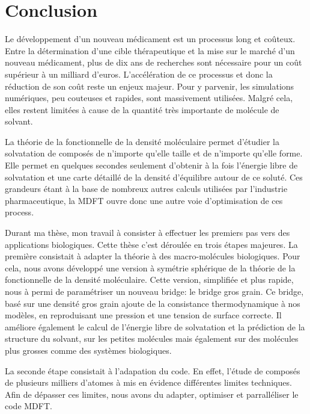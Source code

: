 \chapter{Conclusion}
\label{chap:conclusion}
Le développement d'un nouveau médicament est un processus long et co\^uteux. Entre la détermination d'une cible thérapeutique et la mise sur le marché d'un nouveau médicament, plus de dix ans de recherches sont nécessaire pour un coût supérieur à un milliard d'euros.
L'accélération de ce processus et donc la réduction de son coût reste un enjeux majeur. Pour y parvenir, les simulations numériques, peu couteuses et rapides, sont massivement utilisées. Malgré cela, elles restent limitées à cause de la quantité très importante de molécule de solvant.


La théorie de la fonctionnelle de la densité moléculaire permet d'étudier la solvatation de composés de n'importe qu'elle taille et de n'importe qu'elle forme. Elle permet en quelques secondes seulement d'obtenir à la fois l'énergie libre de solvatation et une carte détaillé de la densité d'équilibre autour de ce soluté.
Ces grandeurs étant à la base de nombreux autres calculs utilisées par l'industrie pharmaceutique, la MDFT ouvre donc une autre voie d'optimisation de ces process.


Durant ma thèse, mon travail à consister à effectuer les premiers pas vers des applications biologiques. Cette thèse c'est déroulée en trois étapes majeures. La première consistait à adapter la théorie à des macro-molécules biologiques. Pour cela, nous avons développé une version à symétrie sphérique de la théorie de la fonctionnelle de la densité moléculaire. Cette version, simplifiée et plus rapide, nous à permi de paramétriser un nouveau bridge: le bridge gros grain.
Ce bridge, basé sur une densité gros grain ajoute de la consistance thermodynamique à nos modèles, en reproduisant une pression et une tension de surface correcte. Il améliore également le calcul de l’énergie libre de solvatation et la prédiction de la structure du solvant, sur les petites molécules mais également sur des molécules plus grosses comme des systèmes biologiques.


La seconde étape consistait à l'adapation du code. En effet, l'étude de composés de plusieurs milliers d'atomes à mis en évidence différentes limites techniques. Afin de dépasser ces limites, nous avons du adapter, optimiser et parralléliser le code MDFT.


